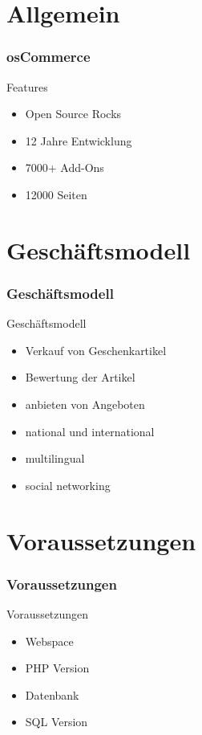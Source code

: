 \documentclass[xcolor=dvipsnames]{beamer}
\begin{document}
\section{Allgemein}
\begin{frame} %
  \frametitle{osCommerce} %
  \begin{block}{Features}
	  \begin{itemize}
		\item Open Source Rocks
		\item 12 Jahre Entwicklung
		\item 7000+ Add-Ons
		\item 12000 Seiten
	  \end{itemize}
  \end{block}
\end{frame}

\section{Geschäftsmodell}
\begin{frame} %
  \frametitle{Geschäftsmodell} %
  \begin{block}{Geschäftsmodell}
	  \begin{itemize}
		\item Verkauf von Geschenkartikel
		\item Bewertung der Artikel
		\item anbieten von Angeboten
		\item national und international
		\item multilingual
		\item social networking
	  \end{itemize}
  \end{block}
\end{frame}

\section{Voraussetzungen}
\begin{frame} %
  \frametitle{Voraussetzungen} %
  \begin{block}{Voraussetzungen}
	  \begin{itemize}
		\item Webspace
		\item PHP Version
		\item Datenbank
		\item SQL Version
	  \end{itemize}
  \end{block}
\end{frame}
\end{document}
